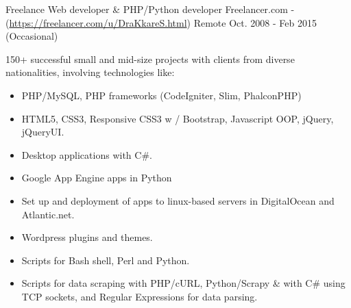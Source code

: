 \begin{cventries}
\cventry
{Freelance Web developer \& PHP/Python developer} %
{Freelancer.com - (\href{https://freelancer.com/u/DraKkareS.html}{https://freelancer.com/u/DraKkareS.html})} %
{Remote} %
{Oct. 2008 - Feb 2015 (Occasional)} %
{ %
	\begin{cvitems}
		\item {150+ successful small and mid-size projects with clients from diverse nationalities, involving technologies like:
		\begin{itemize}
			\item {PHP/MySQL, PHP frameworks (CodeIgniter, Slim, PhalconPHP)}
			\item {HTML5, CSS3, Responsive CSS3 w / Bootstrap, Javascript OOP, jQuery, jQueryUI.}
			\item {Desktop applications with C\#.}
			\item {Google App Engine apps in Python}
			\item {Set up and deployment of apps to linux-based servers in DigitalOcean and Atlantic.net.}
			\item {Wordpress plugins and themes.}
			\item {Scripts for Bash shell, Perl and Python.}
			\item {Scripts for data scraping with PHP/cURL, Python/Scrapy \& with C\# using TCP sockets, and Regular Expressions for data parsing.}
		\end{itemize}	
	}	
	\end{cvitems}
}


\end{cventries}